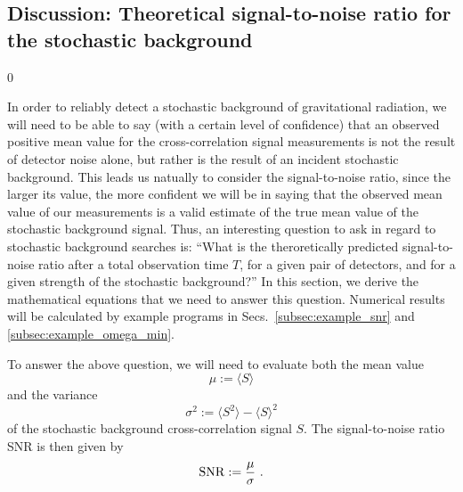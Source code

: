 \clearpage

\subsection{Discussion: Theoretical signal-to-noise ratio for the 
stochastic background}
\label{subsec:discussion_snr}
\setcounter{equation}0

In order to reliably detect a stochastic background of gravitational
radiation, we will need to be able to say 
(with a certain level of confidence) 
that an observed positive mean value for the cross-correlation signal 
measurements is not the result of detector noise alone, but rather 
is the result of an incident stochastic background.
This leads us natually to consider the signal-to-noise ratio,
since the larger its value, the more confident we will be in saying 
that the observed mean value of our measurements is a valid estimate 
of the true mean value of the stochastic background signal.
Thus, an interesting question to ask in regard to stochastic
background searches is:
``What is the theroretically predicted signal-to-noise ratio after a 
total observation time $T$, for a given pair of detectors, and for a 
given strength of the stochastic background?''
In this section, we derive the mathematical equations that we need 
to answer this question.
Numerical results will be calculated by example programs in
Secs.~\ref{subsec:example_snr} and \ref{subsec:example_omega_min}.

To answer the above question, we will need to evaluate both the mean value
%
\begin{equation}
\mu:=\langle S\rangle
\end{equation}
%
and the variance
%
\begin{equation}
\sigma^2:=\langle S^2\rangle-\langle S\rangle^2
\end{equation}
%
of the stochastic background cross-correlation signal $S$.
The signal-to-noise ratio SNR is then given by
%
\begin{equation}
{\rm SNR}:={\mu\over\sigma}\ .
\label{eq:SNR}
\end{equation}

